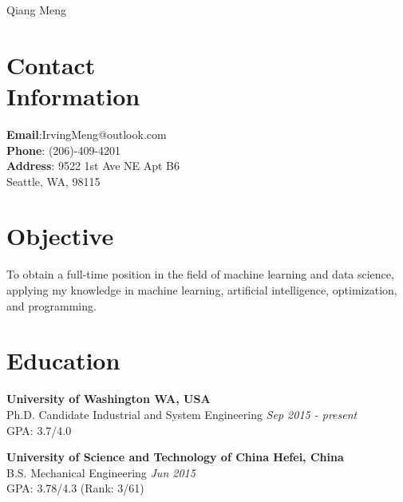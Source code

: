\documentclass[margin,line,11pt]{resume}
\begin{document}
{\sc \Large Qiang Meng}
\begin{resume}



 
    \section{\mysidestyle Contact\\Information}
    \textbf{Email}:\hspace{1.5em}\quad  IrvingMeng@outlook.com \\
    \textbf{Phone}: \hspace{1.5em} (206)-409-4201\\ 
    \textbf{Address}: \hspace{1em}9522 1st Ave NE Apt B6\\
     \hspace*{6em}Seattle, WA, 98115 

    \section{\mysidestyle  Objective}
 To obtain a full-time position in the field of machine learning and data science, applying my knowledge in machine learning, artificial intelligence, optimization, and programming.
      

     \section{\mysidestyle Education}
     \textbf{University of Washington  \hfill WA, USA}\\
Ph.D. Candidate \quad  Industrial and System Engineering \hfill \textit{Sep 2015 - present}\\
 GPA: 3.7/4.0 \par

 \textbf{University of Science and Technology of China \hfill Hefei, China}\\
 B.S. \quad Mechanical Engineering \hfill \textit{Jun 2015}\\
 GPA: 3.78/4.3 (Rank: 3/61)
           

\end{resume}
\end{document}
